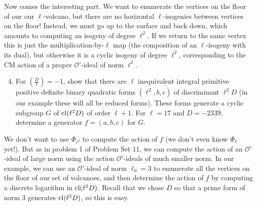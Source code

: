 \documentclass[11pt]{article}
\renewcommand{\O}{\mathcal{O}}
\newcommand{\cl}{{\rm cl}}
\theoremstyle{definition}
\begin{document}
Now comes the interesting part.  We want to enumerate the vertices on the floor of our our $\ell$-volcano, but there are no horizontal $\ell$-isogenies between vertices on the floor!  Instead, we must go up to the surface and back down, which amounts to computing an isogeny of degree $\ell^2$.  If we return to the same vertex this is just the multiplication-by-$\ell$ map (the composition of an $\ell$-isogeny with its dual), but otherwise it is a cyclic isogeny of degree $\ell^2$,
corresponding to the CM action of a proper $\O'$-ideal of norm $\ell^2$.

\begin{enumerate}[{\bf (a)}]
\setcounter{enumi}{3}
\item For $(\frac{D}{\ell})=-1$, show that there are $\ell$ inequivalent integral primitive positive definite binary quadratic forms $(\ell^2,b,c)$ of discriminant $\ell^2D$ (in our example these will all be reduced forms).
These forms generate a cyclic subgroup $G$ of $\cl(\ell^2D)$ of order $\ell+1$.
For $\ell=17$ and $D=-2339$, determine a generator $f=(a,b,c)$ for $G$.
\end{enumerate}

We don't want to use $\Phi_{\ell^2}$ to compute the action of $f$ (we don't even know $\Phi_\ell$ yet!).
But as in problem 1 of Problem Set 11, we can compute the action of an $\O'$-ideal of large norm using the action $\O'$-ideals of much smaller norm.  In our example, we can use an $\O'$-ideal of norm $\ell_0=3$ to enumerate all the vertices on the floor of our set of volcanoes, and then determine the action of $f$ by computing a discrete logarithm in $\cl(\ell^2D)$.
Recall that we chose $D$ so that a prime form of norm 3 generates $\cl(\ell^2D)$, so this is easy.
\end{document}
